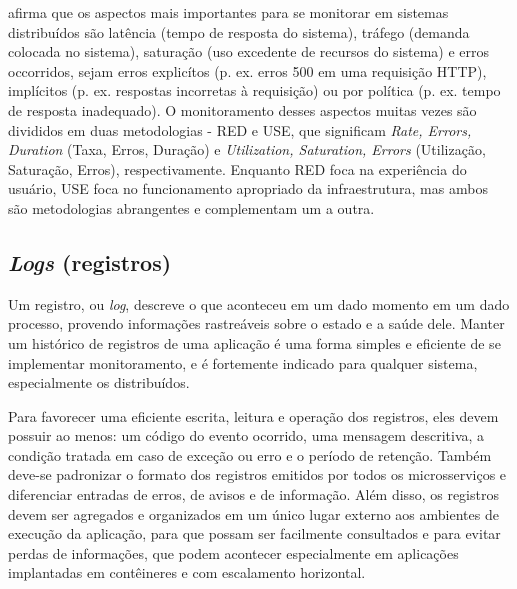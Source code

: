  afirma que os aspectos mais importantes para se monitorar em sistemas distribuídos são latência (tempo de resposta do sistema), tráfego (demanda colocada no sistema), saturação (uso excedente de recursos do sistema) e erros occorridos, sejam erros explicítos (p. ex. erros 500 em uma requisição HTTP), implícitos (p. ex. respostas incorretas à requisição) ou por política (p. ex. tempo de resposta inadequado). O monitoramento desses aspectos muitas vezes são divididos em duas metodologias - RED e USE, que significam \emph{Rate, Errors, Duration} (Taxa, Erros, Duração) e \emph{Utilization, Saturation, Errors} (Utilização, Saturação, Erros), respectivamente. Enquanto RED foca na experiência do usuário, USE foca no funcionamento apropriado da infraestrutura, mas ambos são metodologias abrangentes e complementam um a outra. \cite{livro-sre-google, grafana-blog}


\subsection{\emph{Logs} (registros)}\label{subsecao-registros}

Um registro, ou \emph{log}, descreve o que aconteceu em um dado momento em um dado processo, provendo informações rastreáveis sobre o estado e a saúde dele. Manter um histórico de registros de uma aplicação é uma forma simples e eficiente de se implementar monitoramento, e é fortemente indicado para qualquer sistema, especialmente os distribuídos. 

Para favorecer uma eficiente escrita, leitura e operação dos registros, eles devem possuir ao menos: um código do evento ocorrido, uma mensagem descritiva, a condição tratada em caso de exceção ou erro e o período de retenção. Também deve-se padronizar o formato dos registros emitidos por todos os microsserviços e diferenciar entradas de erros, de avisos e de informação. Além disso, os registros devem ser agregados e organizados em um único lugar externo aos ambientes de execução da aplicação, para que possam ser facilmente consultados e para evitar perdas de informações, que podem acontecer especialmente em aplicações implantadas em contêineres e com escalamento horizontal. \cite{livro-sre-google-workbook}


